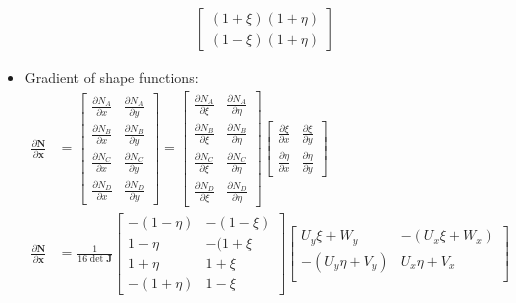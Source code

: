 \documentclass[10pt]{article}
\begin{document}
\begin{itemize}
\begin{align}
\begin{bmatrix}
                (1 + \xi)(1 + \eta) \\
                (1 - \xi)(1 + \eta) 
            \end{bmatrix}
        \end{align}
    \item Gradient of shape functions:
        \begin{align}
            \frac{\partial \mathbf{N}}{\partial \mathbf{x}}
            &=
            \begin{bmatrix}
                \frac{\partial N_A}{\partial x} & \frac{\partial N_A}{\partial y} \\
                \frac{\partial N_B}{\partial x} & \frac{\partial N_B}{\partial y} \\
                \frac{\partial N_C}{\partial x} & \frac{\partial N_C}{\partial y} \\
                \frac{\partial N_D}{\partial x} & \frac{\partial N_D}{\partial y}
            \end{bmatrix}
            =
            \begin{bmatrix}
                \frac{\partial N_A}{\partial \xi} & \frac{\partial N_A}{\partial \eta} \\
                \frac{\partial N_B}{\partial \xi} & \frac{\partial N_B}{\partial \eta} \\
                \frac{\partial N_C}{\partial \xi} & \frac{\partial N_C}{\partial \eta} \\
                \frac{\partial N_D}{\partial \xi} & \frac{\partial N_D}{\partial \eta}
            \end{bmatrix}
            \begin{bmatrix}
                \frac{\partial \xi}{\partial x} & \frac{\partial \xi}{\partial y} \\
                \frac{\partial \eta}{\partial x} & \frac{\partial \eta}{\partial y}
            \end{bmatrix} \\
            \frac{\partial \mathbf{N}}{\partial \mathbf{x}}
            &=
            \frac{1}{16 \det \mathbf{J}}
            \begin{bmatrix}
                -(1-\eta) & -(1-\xi) \\
                1-\eta & -(1+\xi \\
                1+\eta & 1+\xi \\
                -(1+\eta) & 1-\xi
            \end{bmatrix}
            \begin{bmatrix}
                U_y \xi + W_y & -(U_x \xi + W_x) \\
                -(U_y \eta + V_y) & U_x \eta + V_x \\
            \end{bmatrix}
        \end{align}
\end{itemize}
\end{document}
